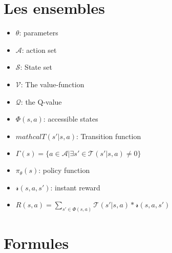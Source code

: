 \documentclass[8pt,a4paper]{extarticle}
\begin{document}
\section*{Les ensembles}

\begin{multicols}{2}

\begin{itemize}

\item
  $\theta$: parameters
\item
  $\mathcal{A}$: action set
\item
  $\mathcal{S}$: State set
\item
  $\mathcal V$: The value-function
\item
  $\mathcal Q$: the Q-value
\item
  $\Phi(s, a)$: accessible states 

\item
  $mathcal T(s' | s, a)$: Transition function
  
\item
  $\Gamma (s) = \{ a \in \mathcal{A} | \exists s' \in \mathcal T (s' | s, a) \neq 0 \}$

\item
  $\pi_{\theta}(s)$: policy function

\item
  $\mathcal r(s, a, s')$: instant reward

\item
  $R(s, a)= \sum_{s' \in \Phi(s, a)} \mathcal T(s' | s, a)* \mathcal r(s, a, s')$
 
\end{itemize}

\end{multicols}

\section*{Formules}
\end{document}

